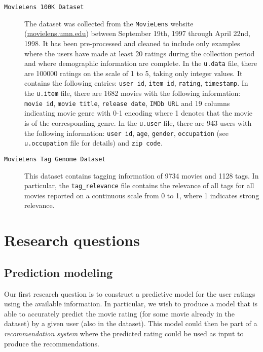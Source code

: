 \documentclass[bj, preprint]{imsart}
\begin{document}
\begin{description}
	\item[\texttt{MovieLens 100K Dataset}] 
	The dataset was collected from the \texttt{MovieLens} website (\url{movielens.umn.edu}) between September 19th, 1997 through April 22nd, 1998. 
	It has been pre-processed and cleaned to include only examples where the users have made at least 20 ratings during the collection period and where demographic information are complete. 
	In the \texttt{u.data} file, there are \num{100000} ratings on the scale of 1 to 5, taking only integer values. 
	It contains the following entries: \texttt{user id}, \texttt{item id}, \texttt{rating}, \texttt{timestamp}. 
	In the \texttt{u.item} file, there are \num{1682} movies with the following information: \texttt{movie id}, \texttt{movie title}, \texttt{release date}, \texttt{IMDb URL} and 19 columns indicating movie genre with 0-1 encoding where 1 denotes that the movie is of the corresponding genre. 
	In the \texttt{u.user} file, there are \num{943} users with the following information: \texttt{user id}, \texttt{age}, \texttt{gender}, \texttt{occupation} (see \texttt{u.occupation} file for details) and \texttt{zip code}.
	\item[\texttt{MovieLens Tag Genome Dataset}] 
	This dataset contains tagging information of \num{9734} movies and \num{1128} tags. 
	In particular, the \texttt{tag\_relevance} file contains the relevance of all tags for all movies reported on a continuous scale from 0 to 1, where 1 indicates strong relevance.
\end{description}


\section{Research questions}\label{sec:setting}

\subsection{Prediction modeling}

Our first research question is to construct a predictive model for the user ratings using the available information. In particular, we wish to produce a model that is able to accurately predict the movie rating (for some movie already in the dataset) by a given user (also in the dataset). This model could then be part of a \textit{recommendation system} where the predicted rating could be used as input to produce the recommendations.
\end{document}

